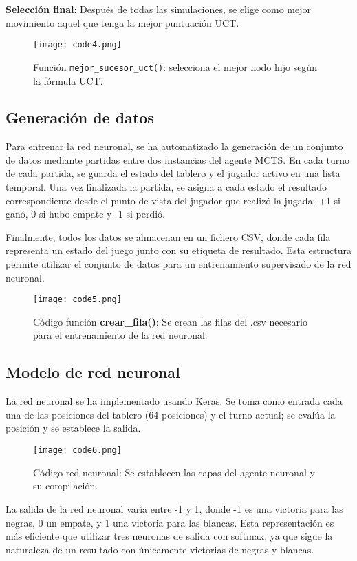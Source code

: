\documentclass[conference]{IEEEtran}
\begin{document}
\textbf{Selección final}: Después de todas las simulaciones, se elige como mejor movimiento aquel que tenga la mejor puntuación UCT.

\begin{figure}[htbp]
    \centerline{\texttt{[image: code4.png]}}
    \caption{Función \texttt{mejor\_sucesor\_uct()}: selecciona el mejor nodo hijo según la fórmula UCT.}
\end{figure}

\subsection{Generación de datos}
Para entrenar la red neuronal, se ha automatizado la generación de un conjunto de datos mediante partidas entre dos instancias del agente MCTS. En cada turno de cada partida, se guarda el estado del tablero y el jugador activo en una lista temporal. Una vez finalizada la partida, se asigna a cada estado el resultado correspondiente desde el punto de vista del jugador que realizó la jugada: +1 si ganó, 0 si hubo empate y -1 si perdió. 

Finalmente, todos los datos se almacenan en un fichero CSV, donde cada fila representa un estado del juego junto con su etiqueta de resultado. Esta estructura permite utilizar el conjunto de datos para un entrenamiento supervisado de la red neuronal.

\begin{figure}[htbp]
    \centerline{\texttt{[image: code5.png]}}
    \caption{Código función \textbf{crear\_fila()}: Se crean las filas del .csv necesario para el entrenamiento de la red neuronal.}
    \label{código5}
\end{figure}

\subsection{Modelo de red neuronal}
La red neuronal se ha implementado usando Keras. Se toma como entrada cada una de las posiciones del tablero (64 posiciones) y el turno actual; se evalúa la posición y se establece la salida.
\begin{figure}[htbp]
    \centerline{\texttt{[image: code6.png]}}
    \caption{Código red neuronal: Se establecen las capas del agente neuronal y su compilación.}
    \label{código6}
\end{figure}

La salida de la red neuronal varía entre -1 y 1, donde -1 es una victoria para las negras, 0 un empate, y 1 una victoria para las blancas. Esta representación es más eficiente que utilizar tres neuronas de salida con softmax, ya que sigue la naturaleza de un resultado con únicamente victorias de negras y blancas.
\end{document}
